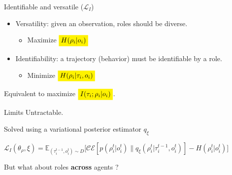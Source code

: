 \documentclass{beamer}
\newcommand{\mathcolorbox}[2]{\colorbox{#1}{$\displaystyle #2$}}
\begin{document}
    \begin{frame}{Identifiable and versatile ($\mathcal{L}_{I}$)}

        \begin{itemize}
            \item Versatility: given an observation, roles should be diverse.
            \begin{itemize}
                \item Maximize $\mathcolorbox{yellow}{H(\rho_i|o_i)}$
            \end{itemize}
            \pause\item Identifiability: a trajectory (behavior) must be identifiable by a role.
            \begin{itemize}
                \item Minimize $\mathcolorbox{yellow}{H(\rho_i|\tau_i, o_i)}$
            \end{itemize}
        \end{itemize}
        \pause
        \begin{block}{}
            Equivalent to maximize $\mathcolorbox{yellow}{I(\tau_i;\rho_i|o_i)}$.
        \end{block}
        \pause
        \begin{alertblock}{Limits}
            Untractable.
        \end{alertblock}
        \pause
        \begin{exampleblock}{Solved using a variational posterior estimator $q_\xi$}

            $\mathcal{L}_I(\theta_\rho, \xi) = \mathbb{E}_{(\tau^{t-1}_i, o^t_i)\sim D}\big[\mathcal{CE}[p(\rho^{t}_i | o^t_i)\| q_\xi(\rho^{t}_i | \tau^{t-1}_i, o^t_i)] - H(\rho^{t}_i | o^t_i)\big]$

        \end{exampleblock}

        \pause
        \begin{block}{}
            But what about roles \textbf{across} agents ?
        \end{block}

    \end{frame}
\end{document}
